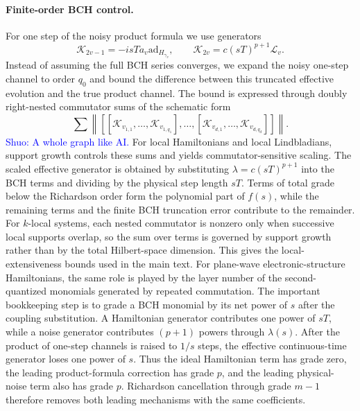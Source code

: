 \documentclass[aps,pra,reprint,superscriptaddress]{revtex4-2}
\newcommand{\Lind}{\mathcal{L}}
\newcommand{\ad}{\mathrm{ad}}
\newcommand{\sz}[1]{\textcolor{blue}{Shuo: #1}}
\begin{document}
\paragraph{Finite-order BCH control.}
For one step of the noisy product formula we use generators
\begin{equation}
    \mathcal{K}_{2v-1}=-i sT a_v\ad_{H_{\gamma_v}},
    \qquad
    \mathcal{K}_{2v}=c(sT)^{p+1}\Lind_v .
\end{equation}
Instead of assuming the full BCH series converges, we expand the noisy one-step channel to order $q_0$ and bound the difference between this truncated effective evolution and the true product channel.
The bound is expressed through doubly right-nested commutator sums of the schematic form
\begin{equation}
    \sum
    \left\|
    \left[
        [\mathcal{K}_{v_{1,1}},\ldots,\mathcal{K}_{v_{1,q_1}}],
        \ldots,
        [\mathcal{K}_{v_{d,1}},\ldots,\mathcal{K}_{v_{d,q_d}}]
    \right]
    \right\|.
\end{equation}
\sz{A whole graph like AI.}
For local Hamiltonians and local Lindbladians, support growth controls these sums and yields commutator-sensitive scaling.
The scaled effective generator is obtained by substituting $\lambda=c(sT)^{p+1}$ into the BCH terms and dividing by the physical step length $sT$.
Terms of total grade below the Richardson order form the polynomial part of $f(s)$, while the remaining terms and the finite BCH truncation error contribute to the remainder.
For $k$-local systems, each nested commutator is nonzero only when successive local supports overlap, so the sum over terms is governed by support growth rather than by the total Hilbert-space dimension.
This gives the local-extensiveness bounds used in the main text.
For plane-wave electronic-structure Hamiltonians, the same role is played by the layer number of the second-quantized monomials generated by repeated commutation.
The important bookkeeping step is to grade a BCH monomial by its net power of $s$ after the coupling substitution.
A Hamiltonian generator contributes one power of $sT$, while a noise generator contributes $(p+1)$ powers through $\lambda(s)$.
After the product of one-step channels is raised to $1/s$ steps, the effective continuous-time generator loses one power of $s$.
Thus the ideal Hamiltonian term has grade zero, the leading product-formula correction has grade $p$, and the leading physical-noise term also has grade $p$.
Richardson cancellation through grade $m-1$ therefore removes both leading mechanisms with the same coefficients.
\end{document}
